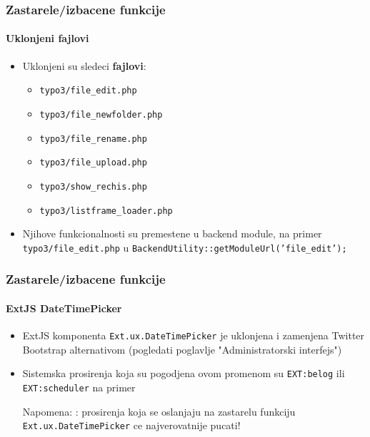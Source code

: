 \begin{frame}[fragile]
	\frametitle{Zastarele/izbacene funkcije}
	\framesubtitle{Uklonjeni fajlovi}

	\begin{itemize}
		\item Uklonjeni su sledeci \textbf{fajlovi}:

			\begin{itemize}
				\item \texttt{typo3/file\_edit.php}
				\item \texttt{typo3/file\_newfolder.php}
				\item \texttt{typo3/file\_rename.php}
				\item \texttt{typo3/file\_upload.php}
				\item \texttt{typo3/show\_rechis.php}
				\item \texttt{typo3/listframe\_loader.php}
			\end{itemize}

		\item Njihove funkcionalnosti su premestene u backend module,
			na primer \texttt{typo3/file\_edit.php} u \texttt{BackendUtility::getModuleUrl('file\_edit');}

	\end{itemize}

\end{frame}


\begin{frame}[fragile]
	\frametitle{Zastarele/izbacene funkcije}
	\framesubtitle{ExtJS DateTimePicker}

	\begin{itemize}

		\item ExtJS komponenta \texttt{Ext.ux.DateTimePicker} je uklonjena i zamenjena Twitter Bootstrap alternativom
			(pogledati poglavlje "Administratorski interfejs")

		\item Sistemska prosirenja koja su pogodjena ovom promenom su \texttt{EXT:belog} ili
			\texttt{EXT:scheduler} na primer

			\vspace{0.2cm}

			\begingroup
				\color{red}
					Napomena: : prosirenja koja se oslanjaju na zastarelu funkciju
					\texttt{Ext.ux.DateTimePicker} ce najverovatnije pucati!
			\endgroup

	\end{itemize}

\end{frame}

